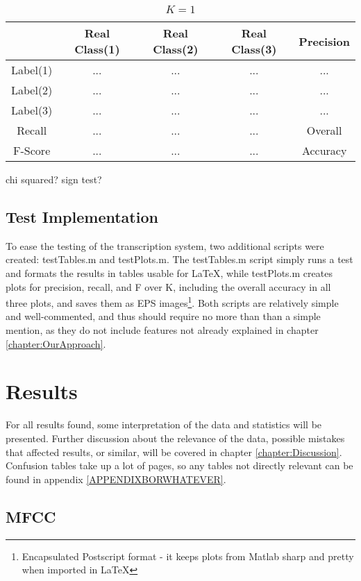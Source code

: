 			\begin{table}
				\centering
				\begin{tabular}{|c | c | c | c | c |}
					\hline
					 & Real Class(1) & Real Class(2) & Real Class(3) & Precision\\ \hline
					Label(1)  & ... & ... & ... & ...\\ \hline
					Label(2)  & ... & ... & ... & ...\\ \hline
					Label(3) & ... & ... & ... & ...\\ \hline
					Recall   & ... & ... & ... & \multicolumn{1}{c}{Overall}\\ \cline{1-4}
					F-Score & ... & ... & ... & \multicolumn{1}{c}{Accuracy} \\ \cline{1-4}
				\end{tabular}
				\caption{$K=1$}
				\label{table:eval:explanatory}
			\end{table}
		chi squared?
		sign test?
		
		
	\subsection{Test Implementation}		%
		To ease the testing of the transcription system, two additional scripts were created: testTables.m and testPlots.m.
		The testTables.m script simply runs a test and formats the results in tables usable for \LaTeX, while testPlots.m creates plots for precision, recall, and F over K, including the overall accuracy in all three plots, and saves them as EPS images\footnote{Encapsulated Postscript format - it keeps plots from Matlab sharp and pretty when imported in \LaTeX}. Both scripts are relatively simple and well-commented, and thus should require no more than than a simple mention, as they do not include features not already explained in chapter \ref{chapter:OurApproach}.
			
 
\section{Results}
For all results found, some interpretation of the data and statistics will be presented. Further discussion about the relevance of the data, possible mistakes that affected results, or similar, will be covered in chapter \ref{chapter:Discussion}. 
Confusion tables take up a lot of pages, so any tables not directly relevant can be found in appendix \ref{APPENDIXBORWHATEVER}.


	\subsection{MFCC}
		
		
